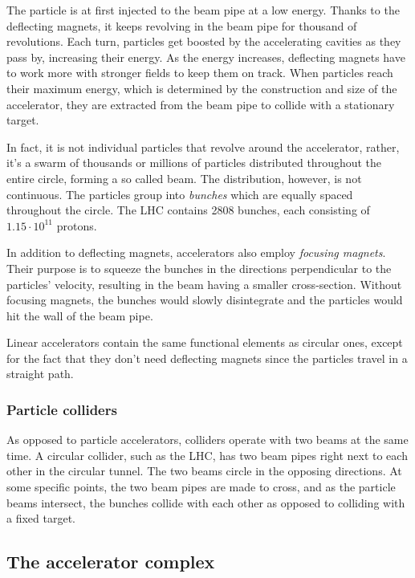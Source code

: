 \documentclass[12pt]{article}
\begin{document}
The particle is at first injected to the beam pipe at a low energy. Thanks to the deflecting magnets, it keeps revolving in the beam pipe for thousand of revolutions. Each turn, particles get boosted by the accelerating cavities as they pass by, increasing their energy. As the energy increases, deflecting magnets have to work more with stronger fields to keep them on track. When particles reach their maximum energy, which is determined by the construction and size of the accelerator, they are extracted from the beam pipe to collide with a stationary target.

In fact, it is not individual particles that revolve around the accelerator, rather, it's a swarm of thousands or millions of particles distributed throughout the entire circle, forming a so called beam. The distribution, however, is not continuous. The particles group into \textit{bunches} which are equally spaced throughout the circle. The LHC contains 2808 bunches, each consisting of $1.15\cdot10^{11}$ protons.

In addition to deflecting magnets, accelerators also employ \textit{focusing magnets}. Their purpose is to squeeze the bunches in the directions perpendicular to the particles' velocity, resulting in the beam having a smaller cross-section. Without focusing magnets, the bunches would slowly disintegrate and the particles would hit the wall of the beam pipe.

Linear accelerators contain the same functional elements as circular ones, except for the fact that they don't need deflecting magnets since the particles travel in a straight path.

\subsubsection{Particle colliders}\label{sec_part_collider}

As opposed to particle accelerators, colliders operate with two beams at the same time. A circular collider, such as the LHC, has two beam pipes right next to each other in the circular tunnel. The two beams circle in the opposing directions. At some specific points, the two beam pipes are made to cross, and as the particle beams intersect, the bunches collide with each other as opposed to colliding with a fixed target.


\subsection{The accelerator complex \cite{cern_accel_complex}}\label{sec_accel_complex}
\end{document}
